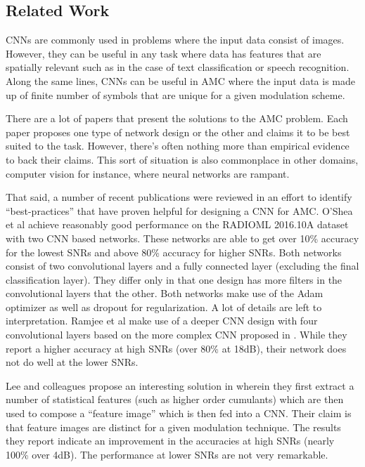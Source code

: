\documentclass[journal,onecolumn]{IEEEtran}
\begin{document}
\subsection{Related Work}

CNNs are commonly used in problems where the input data consist of images. However, they can be useful in any task where data has features that are spatially relevant such as in the case of text classification or speech recognition. Along the same lines, CNNs can be useful in AMC where the input data is made up of finite number of symbols that are unique for a given modulation scheme. 

There are a lot of papers that present the solutions to the AMC problem. Each paper proposes one type of network design or the other and claims it to be best suited to the task. However, there’s often nothing more than empirical evidence to back their claims. This sort of situation is also commonplace in other domains, computer vision for instance, where neural networks are rampant.

That said, a number of recent publications were reviewed in an effort to identify “best-practices” that have proven helpful for designing a CNN for AMC. O’Shea et al \cite{cnn2} achieve reasonably good performance on the RADIOML 2016.10A dataset with two CNN based networks. These networks are able to get over 10\% accuracy for the lowest SNRs and above 80\% accuracy for higher SNRs. Both networks consist of two convolutional layers and a fully connected layer (excluding the final classification layer). They differ only in that one design has more filters in the convolutional layers that the other. Both networks make use of the Adam optimizer as well as dropout for regularization. A lot of details are left to interpretation. Ramjee et al \cite{cnn1} make use of a deeper CNN design with four convolutional layers based on the more complex CNN proposed in \cite{cnn2}. While they report a higher accuracy at high SNRs (over 80\% at 18dB), their network does not do well at the lower SNRs. 

Lee and colleagues propose an interesting solution in \cite{featImage} wherein they first extract a number of statistical features (such as higher order cumulants) which are then used to compose a “feature image” which is then fed into a CNN. Their claim is that feature images are distinct for a given modulation technique. The results they report indicate an improvement in the accuracies at high SNRs (nearly 100\% over 4dB). The performance at lower SNRs are not very remarkable.
\end{document}
